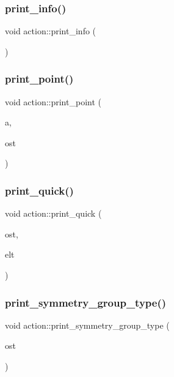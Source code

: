 \subsubsection{\texorpdfstring{print\+\_\+info()}{print\_info()}}
{\footnotesize\ttfamily void action\+::print\+\_\+info (\begin{DoxyParamCaption}{ }\end{DoxyParamCaption})}

\mbox{\label{classaction_a85ae5eb443c2b03b1127ec9631ce7c57}} 
\subsubsection{\texorpdfstring{print\+\_\+point()}{print\_point()}}
{\footnotesize\ttfamily void action\+::print\+\_\+point (\begin{DoxyParamCaption}\item[{\mbox{\hyperlink{galois_8h_a09fddde158a3a20bd2dcadb609de11dc}{I\+NT}}}]{a,  }\item[{ostream \&}]{ost }\end{DoxyParamCaption})}

\mbox{\label{classaction_ac38aba22570e8a6ae919e4179a6785e2}} 
\subsubsection{\texorpdfstring{print\+\_\+quick()}{print\_quick()}}
{\footnotesize\ttfamily void action\+::print\+\_\+quick (\begin{DoxyParamCaption}\item[{ostream \&}]{ost,  }\item[{void $\ast$}]{elt }\end{DoxyParamCaption})}

\mbox{\label{classaction_aed811766c7e64fe2c853df8b0b67aa6e}} 
\subsubsection{\texorpdfstring{print\+\_\+symmetry\+\_\+group\+\_\+type()}{print\_symmetry\_group\_type()}}
{\footnotesize\ttfamily void action\+::print\+\_\+symmetry\+\_\+group\+\_\+type (\begin{DoxyParamCaption}\item[{ostream \&}]{ost }\end{DoxyParamCaption})}

